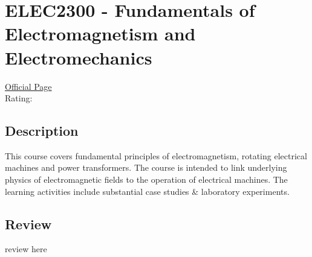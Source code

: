 \hypertarget{ELEC2300}{\section{ELEC2300 - Fundamentals of Electromagnetism and Electromechanics}}

\large
\textcolor{turbo_purple}{\href{https://my.uq.edu.au/programs-courses/course.html?course_code=ELEC2300}{Official Page}} \\
Rating: \cstar\cstar\cstar\cstar\ostar

\normalsize
\subsection*{Description}
This course covers fundamental principles of electromagnetism, rotating electrical machines and power transformers.
The course is intended to link underlying physics of electromagnetic fields to the operation of electrical machines.
The learning activities include substantial case studies \& laboratory experiments.

\subsection*{Review}
review here
